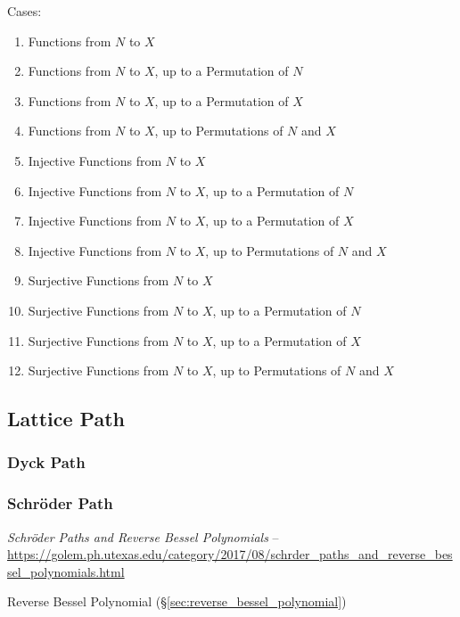 Cases:
\begin{enumerate}
  \item Functions from $N$ to $X$
  \item Functions from $N$ to $X$, up to a Permutation of $N$
  \item Functions from $N$ to $X$, up to a Permutation of $X$
  \item Functions from $N$ to $X$, up to Permutations of $N$ and $X$
  \item Injective Functions from $N$ to $X$
  \item Injective Functions from $N$ to $X$, up to a Permutation of $N$
  \item Injective Functions from $N$ to $X$, up to a Permutation of $X$
  \item Injective Functions from $N$ to $X$, up to Permutations of $N$ and $X$
  \item Surjective Functions from $N$ to $X$
  \item Surjective Functions from $N$ to $X$, up to a Permutation of $N$
  \item Surjective Functions from $N$ to $X$, up to a Permutation of $X$
  \item Surjective Functions from $N$ to $X$, up to Permutations of $N$ and $X$
\end{enumerate}



\subsection{Lattice Path}\label{sec:lattice_path}

\subsubsection{Dyck Path}\label{sec:dyck_path}

\subsubsection{Schr\"oder Path}\label{sec:schroder_path}

\emph{Schr\"oder Paths and Reverse Bessel Polynomials} --
\url{https://golem.ph.utexas.edu/category/2017/08/schrder_paths_and_reverse_bessel_polynomials.html}

Reverse Bessel Polynomial (\S\ref{sec:reverse_bessel_polynomial})



